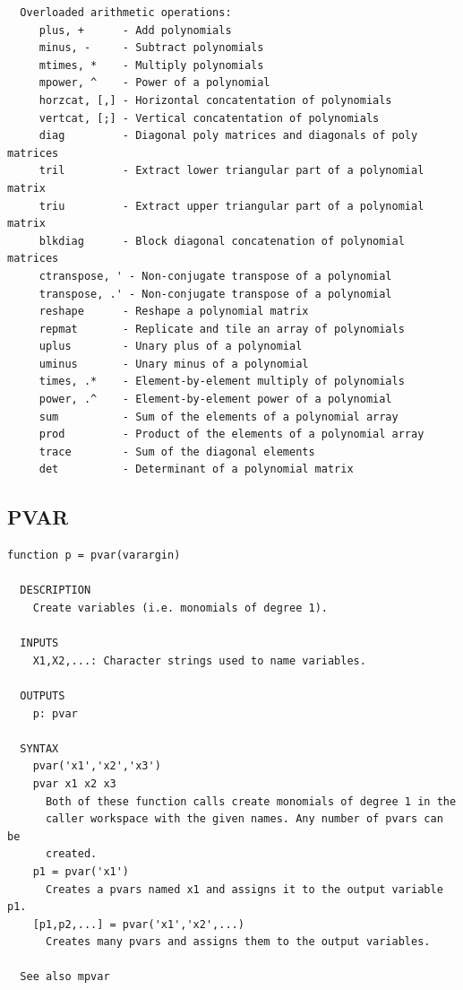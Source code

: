 \documentclass{article}
\begin{document}
\begin{verbatim}
  Overloaded arithmetic operations:
     plus, +      - Add polynomials
     minus, -     - Subtract polynomials
     mtimes, *    - Multiply polynomials
     mpower, ^    - Power of a polynomial
     horzcat, [,] - Horizontal concatentation of polynomials
     vertcat, [;] - Vertical concatentation of polynomials
     diag         - Diagonal poly matrices and diagonals of poly matrices
     tril         - Extract lower triangular part of a polynomial matrix
     triu         - Extract upper triangular part of a polynomial matrix
     blkdiag      - Block diagonal concatenation of polynomial matrices
     ctranspose, ' - Non-conjugate transpose of a polynomial
     transpose, .' - Non-conjugate transpose of a polynomial
     reshape      - Reshape a polynomial matrix
     repmat       - Replicate and tile an array of polynomials
     uplus        - Unary plus of a polynomial
     uminus       - Unary minus of a polynomial
     times, .*    - Element-by-element multiply of polynomials
     power, .^    - Element-by-element power of a polynomial
     sum          - Sum of the elements of a polynomial array
     prod         - Product of the elements of a polynomial array
     trace        - Sum of the diagonal elements
     det          - Determinant of a polynomial matrix
\end{verbatim}

\newpage
\subsection{PVAR}
\begin{verbatim}
function p = pvar(varargin)

  DESCRIPTION
    Create variables (i.e. monomials of degree 1).

  INPUTS
    X1,X2,...: Character strings used to name variables.

  OUTPUTS
    p: pvar

  SYNTAX
    pvar('x1','x2','x3')
    pvar x1 x2 x3
      Both of these function calls create monomials of degree 1 in the
      caller workspace with the given names. Any number of pvars can be
      created.
    p1 = pvar('x1')
      Creates a pvars named x1 and assigns it to the output variable p1.
    [p1,p2,...] = pvar('x1','x2',...)
      Creates many pvars and assigns them to the output variables.

  See also mpvar

\end{verbatim}
\end{document}
